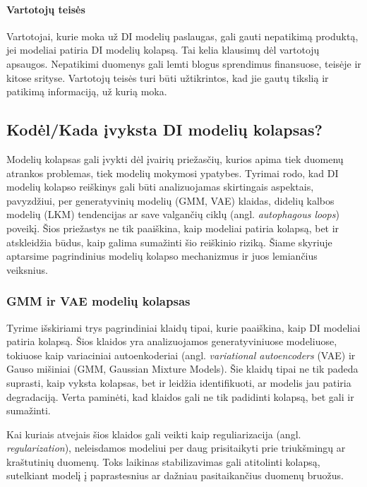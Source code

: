 \documentclass{VUMIFInfKursinis}
\begin{document}
\paragraph{Vartotojų teisės} 
Vartotojai, kurie moka už DI modelių paslaugas, gali gauti nepatikimą produktą, jei modeliai patiria DI modelių kolapsą. Tai kelia klausimų dėl vartotojų apsaugos. Nepatikimi duomenys gali lemti blogus sprendimus finansuose, teisėje ir kitose srityse. Vartotojų teisės turi būti užtikrintos, kad jie gautų tikslią ir patikimą informaciją, už kurią moka.






\subsection{Kodėl/Kada įvyksta DI modelių kolapsas?} \label{KodelKolapsas}
Modelių kolapsas gali įvykti dėl įvairių priežasčių, kurios apima tiek duomenų atrankos problemas, tiek modelių mokymosi ypatybes. Tyrimai rodo, kad DI modelių kolapso reiškinys gali būti analizuojamas skirtingais aspektais, pavyzdžiui, per generatyvinių modelių (GMM, VAE) klaidas, didelių kalbos modelių (LKM) tendencijas ar save valgančių ciklų (angl. \textsl{autophagous loops}) poveikį. Šios priežastys ne tik paaiškina, kaip modeliai patiria kolapsą, bet ir atskleidžia būdus, kaip galima sumažinti šio reiškinio riziką. Šiame skyriuje aptarsime pagrindinius modelių kolapso mechanizmus ir juos lemiančius veiksnius. 


\subsubsection{GMM ir VAE modelių kolapsas}

Tyrime \cite{AICollapseNature} išskiriami trys pagrindiniai klaidų tipai, kurie paaiškina, kaip DI modeliai patiria kolapsą. Šios klaidos yra analizuojamos generatyviniuose modeliuose, tokiuose kaip variaciniai autoenkoderiai (angl. \textsl{variational autoencoders} (VAE) ir Gauso mišiniai (GMM, Gaussian Mixture Models). Šie klaidų tipai ne tik padeda suprasti, kaip vyksta kolapsas, bet ir leidžia identifikuoti, ar modelis jau patiria degradaciją. Verta paminėti, kad klaidos gali ne tik padidinti kolapsą, bet gali ir sumažinti.

Kai kuriais atvejais šios klaidos gali veikti kaip reguliarizacija (angl. \textsl{regularization}), neleisdamos modeliui per daug prisitaikyti prie triukšmingų ar kraštutinių duomenų. Toks laikinas stabilizavimas gali atitolinti kolapsą, sutelkiant modelį į paprastesnius ar dažniau pasitaikančius duomenų bruožus.
\end{document}
